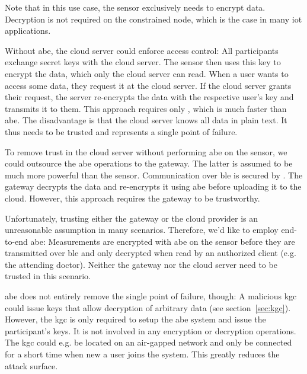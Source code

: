 Note that in this use case, the sensor exclusively needs to encrypt data.
Decryption is not required on the constrained node, which is the case in many \acrshort{iot} applications.

Without \acrshort{abe}, the cloud server could enforce access control:
All participants exchange secret keys with the cloud server.
The sensor then uses this key to encrypt the data, which only the cloud server can read.
When a user wants to access some data, they request it at the cloud server.
If the cloud server grants their request, the server re-encrypts the data with the respective user's key and transmits it to them.
This approach requires only , which is much faster than \acrshort{abe}.
The disadvantage is that the cloud server knows all data in plain text. It thus needs to be trusted and represents a single point of failure.

To remove trust in the cloud server without performing \acrshort{abe} on the sensor, we could outsource the \acrshort*{abe} operations to the gateway.
The latter is assumed to be much more powerful than the sensor.
Communication over \acrshort{ble} is secured by .
The gateway decrypts the data and re-encrypts it using \acrshort{abe} before uploading it to the cloud.
However, this approach requires the gateway to be trustworthy.

Unfortunately, trusting either the gateway or the cloud provider is an unreasonable assumption in many scenarios.
Therefore, we'd like to employ end-to-end \acrlong{abe}:
Measurements are encrypted with \acrshort{abe} on the sensor before they are transmitted over \acrshort{ble} and only decrypted when read by an authorized client (e.g. the attending doctor).
Neither the gateway nor the cloud server need to be trusted in this scenario.

\Acrshort{abe} does not entirely remove the single point of failure, though:
A malicious \acrfull{kgc} could issue keys that allow decryption of arbitrary data (see section~\ref{sec:kgc}).
However, the \acrshort{kgc} is only required to setup the \acrshort{abe} system and issue the participant's keys.
It is not involved in any encryption or decryption operations.
The \acrshort{kgc} could e.g. be located on an air-gapped network and only be connected for a short time when new a user joins the system. 
This greatly reduces the attack surface.


